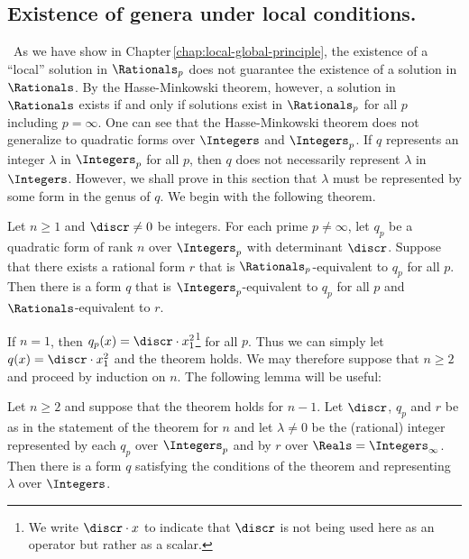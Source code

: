 \subsection{Existence of genera under local conditions.}~As we have show in
Chapter\,\ref{chap:local-global-principle}, the existence of a ``local''
solution in \(\Rationals_p\) does not guarantee the existence of a solution in
\(\Rationals\). By the Hasse-Minkowski theorem, however, a solution in
\(\Rationals\) exists if and only if solutions exist in \(\Rationals_p\) for all
\(p\) including \(p = \infty\). One can see that the Hasse-Minkowski theorem
does not generalize to quadratic forms over \(\Integers\) and \(\Integers_p\).
If \(q\) represents an integer \(\lambda\) in \(\Integers_p\) for all \(p\),
then \(q\) does not necessarily represent \(\lambda\) in \(\Integers\). However,
we shall prove in this section that \(\lambda\) must be represented by some form
in the genus of \(q\). We begin with the following
theorem.\label{sec:genus-existence}

\begin{theoremx}\label{thm:genus-existence} {\normalfont \cite[p.\,129,
    141--143]{cassels2008rational}} Let \(n \geq 1\) and \(\discr \neq 0\) be
    integers. For each prime \(p \neq \infty\), let \(q_p\) be a quadratic form
    of rank \(n\) over \(\Integers_p\) with determinant \(\discr\). Suppose that
    there exists a rational form \(r\) that is \(\Rationals_p\)-equivalent to
    \(q_p\) for all \(p\). Then there is a form \(q\) that is
    \(\Integers_p\)-equivalent to \(q_p\) for all \(p\) and
    \(\Rationals\)-equivalent to \(r\).
\end{theoremx}

If \(n = 1\), then \(q_p(x) = \discr \cdot x_1^2\)\footnote{We write \(\discr
\cdot x\) to indicate that \(\discr\) is not being used here as an operator but
rather as a scalar.} for all \(p\). Thus we can simply let \(q(x) = \discr \cdot
x_1^2\) and the theorem holds. We may therefore suppose that \(n \geq 2\) and
proceed by induction on \(n\). The following lemma will be useful:

\begin{lemma}
    Let \(n \geq 2\) and suppose that the theorem holds for \(n - 1\). Let
    \(\discr\), \(q_p\) and \(r\) be as in the statement of the theorem for
    \(n\) and let \(\lambda \neq 0\) be the (rational) integer represented by
    each \(q_p\) over \(\Integers_p\) and by \(r\) over \(\Reals =
    \Integers_{\infty}\). Then there is a form \(q\) satisfying the conditions
    of the theorem and representing \(\lambda\) over \(\Integers\).
\end{lemma}

